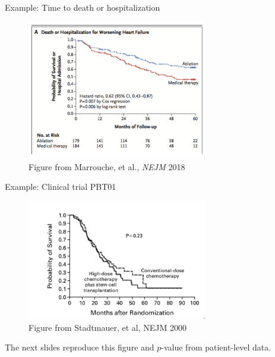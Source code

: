 \documentclass[ignorenonframetext,]{beamer}
\begin{document}
\begin{frame}{%
\protect\hypertarget{example-time-to-death-or-hospitalization}{%
Example: Time to death or hospitalization}}

\begin{figure}
\centering
\includegraphics[width=0.7\textwidth,height=\textheight]{../figures/atrial_fib_death_hosp.pdf}
\caption{Figure from Marrouche, et al., \emph{NEJM} 2018}
\end{figure}

\end{frame}

\begin{frame}{%
\protect\hypertarget{example-clinical-trial-pbt01}{%
Example: Clinical trial PBT01}}

\begin{figure}
\centering
\includegraphics[width=0.7\textwidth,height=\textheight]{../figures/pbt01_survival.pdf}
\caption{Figure from Stadtmauer, et al, NEJM 2000}
\end{figure}

The next slides reproduce this figure and \(p\)-value from patient-level
data.

\end{frame}
\end{document}
